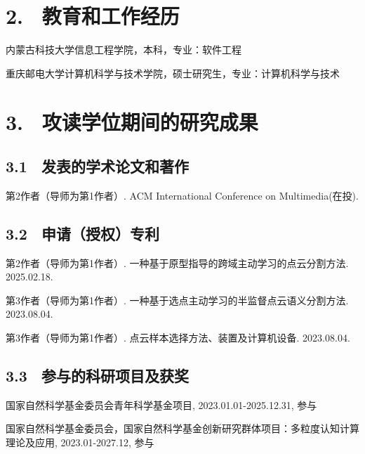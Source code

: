 \section{2. \ 教育和工作经历}
\begin{description}[leftmargin=3.5cm, style=sameline]
\item[2017.09$\sim$2021.07] 内蒙古科技大学信息工程学院，本科，专业：软件工程
\item[2022.09$\sim$2025.06] 重庆邮电大学计算机科学与技术学院，硕士研究生，专业：计算机科学与技术
\end{description}


\section{3. \ 攻读学位期间的研究成果}

\subsection{3.1 \ 发表的学术论文和著作}
\noindent [1]
\begin{minipage}[t]{0.96\linewidth}
第2作者（导师为第1作者）. ACM International Conference on Multimedia(在投).
\end{minipage}
\vspace{0cm}

\subsection{3.2 \ 申请（授权）专利}
\noindent [1]
\begin{minipage}[t]{0.96\linewidth}
第2作者（导师为第1作者）. 一种基于原型指导的跨域主动学习的点云分割方法. 2025.02.18.
\end{minipage}
\noindent [2]
\begin{minipage}[t]{0.96\linewidth}
第3作者（导师为第1作者）. 一种基于选点主动学习的半监督点云语义分割方法. 2023.08.04.
\end{minipage}
\noindent [3]
\begin{minipage}[t]{0.96\linewidth}
第3作者（导师为第1作者）. 点云样本选择方法、装置及计算机设备. 2023.08.04.
\end{minipage}

\subsection{3.3 \ 参与的科研项目及获奖}
\noindent [1]
\begin{minipage}[t]{0.96\linewidth}
    国家自然科学基金委员会青年科学基金项目, 2023.01.01-2025.12.31, 参与
\end{minipage}
\noindent [2]
\begin{minipage}[t]{0.96\linewidth}
    国家自然科学基金委员会，国家自然科学基金创新研究群体项目：多粒度认知计算理论及应用, 2023.01-2027.12, 参与
\end{minipage}